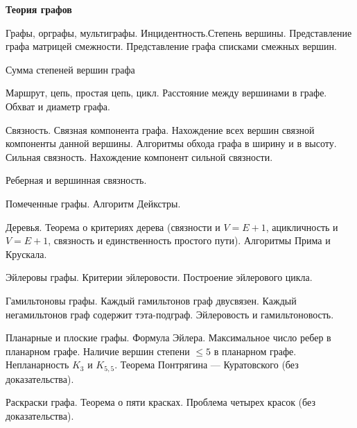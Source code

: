 \documentclass{rpd}
\begin{document}
            \smallskip
            \textbf{Теория графов}
            \begin{examquestions}
            \item
            Графы, орграфы, мультиграфы. Инцидентность.Степень вершины. Представление графа матрицей смежности. Представление графа списками смежных вершин.
            \item
            Сумма степеней вершин графа
            \item
            Маршрут, цепь, простая цепь, цикл. Расстояние между вершинами в графе. Обхват и диаметр графа.
            \item
            Связность. Связная компонента графа. Нахождение всех вершин связной компоненты данной вершины. Алгоритмы обхода графа в ширину и в высоту. Сильная связность. Нахождение компонент сильной связности.
            \item
            Реберная и вершинная связность.
            \item
            Помеченные графы. Алгоритм Дейкстры.
            \item
            Деревья. Теорема о критериях дерева (связности и $V=E+1$, ацикличность и $V=E+1$, связность и единственность простого пути). Алгоритмы Прима и Крускала.
            \item
            Эйлеровы графы. Критерии эйлеровости. Построение эйлерового цикла.
            \item
            Гамильтоновы графы. Каждый гамильтонов граф двусвязен. Каждый негамильтонов граф содержит тэта-подграф. Эйлеровость и гамильтоновость.
            \item
            Планарные и плоские графы. Формула Эйлера. Максимальное число ребер в планарном графе. Наличие вершин степени $\le 5$ в планарном графе. Непланарность $K_3$ и $K_{5,5}$. Теорема Понтрягина — Куратовского (без доказательства).
            \item
            Раскраски графа. Теорема о пяти красках. Проблема четырех красок (без доказательства).
            \end{examquestions}
\end{document}
